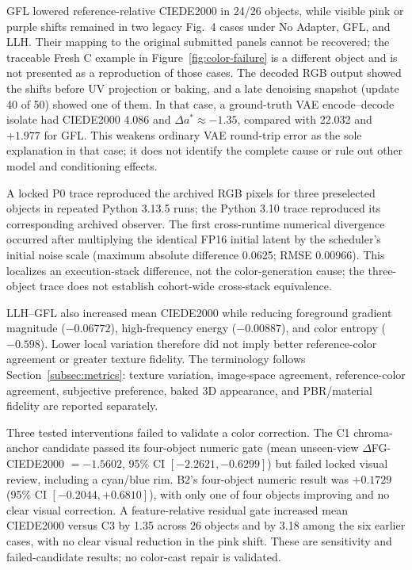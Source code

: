 \documentclass[times,twocolumn,final]{elsarticle}
\begin{document}
GFL lowered reference-relative CIEDE2000 in 24/26 objects, while visible pink or purple shifts remained in two legacy Fig.~4 cases under No Adapter, GFL, and LLH. Their mapping to the original submitted panels cannot be recovered; the traceable Fresh C example in Figure~\ref{fig:color-failure} is a different object and is not presented as a reproduction of those cases. The decoded RGB output showed the shifts before UV projection or baking, and a late denoising snapshot (update 40 of 50) showed one of them. In that case, a ground-truth VAE encode--decode isolate had CIEDE2000 4.086 and $\Delta a^*\approx-1.35$, compared with 22.032 and $+1.977$ for GFL. This weakens ordinary VAE round-trip error as the sole explanation in that case; it does not identify the complete cause or rule out other model and conditioning effects.

A locked P0 trace reproduced the archived RGB pixels for three preselected objects in repeated Python 3.13.5 runs; the Python 3.10 trace reproduced its corresponding archived observer. The first cross-runtime numerical divergence occurred after multiplying the identical FP16 initial latent by the scheduler's initial noise scale (maximum absolute difference 0.0625; RMSE 0.00966). This localizes an execution-stack difference, not the color-generation cause; the three-object trace does not establish cohort-wide cross-stack equivalence.

LLH--GFL also increased mean CIEDE2000 while reducing foreground gradient magnitude ($-0.06772$), high-frequency energy ($-0.00887$), and color entropy ($-0.598$). Lower local variation therefore did not imply better reference-color agreement or greater texture fidelity. The terminology follows Section~\ref{subsec:metrics}: texture variation, image-space agreement, reference-color agreement, subjective preference, baked 3D appearance, and PBR/material fidelity are reported separately.

Three tested interventions failed to validate a color correction. The C1 chroma-anchor candidate passed its four-object numeric gate (mean unseen-view $\Delta$FG-CIEDE2000 $=-1.5602$, 95\% CI $[-2.2621,-0.6299]$) but failed locked visual review, including a cyan/blue rim. B2's four-object numeric result was $+0.1729$ (95\% CI $[-0.2044,+0.6810]$), with only one of four objects improving and no clear visual correction. A feature-relative residual gate increased mean CIEDE2000 versus C3 by 1.35 across 26 objects and by 3.18 among the six earlier cases, with no clear visual reduction in the pink shift. These are sensitivity and failed-candidate results; no color-cast repair is validated.
\end{document}
